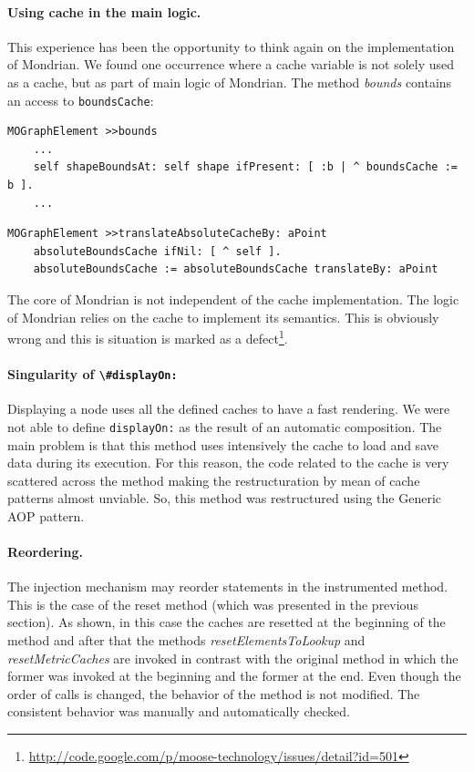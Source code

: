 \documentclass[preprint,10pt]{sigplanconf}
\newcommand{\ct}{\lstinline[backgroundcolor=\color{white},basicstyle=\footnotesize\ttfamily]}
\begin{document}
\paragraph{Using cache in the main logic.}
This experience has been the opportunity to think again on the implementation of Mondrian. We found one occurrence where a cache variable is not solely used as a cache, but as part of main logic of Mondrian. The method \emph{bounds} contains an access to \ct{boundsCache}: 

\begin{lstlisting} 
MOGraphElement >>bounds
	...
	self shapeBoundsAt: self shape ifPresent: [ :b | ^ boundsCache := b ].
	...
\end{lstlisting}

\begin{lstlisting} 
MOGraphElement >>translateAbsoluteCacheBy: aPoint
	absoluteBoundsCache ifNil: [ ^ self ].
	absoluteBoundsCache := absoluteBoundsCache translateBy: aPoint
\end{lstlisting}

The core of Mondrian is not independent of the cache implementation. The logic of Mondrian relies on the cache to implement its semantics. This is obviously wrong and this is situation is marked as a defect\footnote{\url{http://code.google.com/p/moose-technology/issues/detail?id=501}}.

\paragraph{Singularity of \ct{\#displayOn:}} Displaying a node uses all the defined caches to have a fast rendering. We were not able to define \ct{displayOn:} as the result of an automatic composition. The main problem is that this method uses intensively the cache to load and save data during its execution. For this reason, the code related to the cache is very scattered across the method making the restructuration by mean of cache patterns almost unviable. So, this method was restructured using the Generic AOP pattern. 


\paragraph{Reordering.} The injection mechanism may reorder statements in the instrumented method. This is the case of the reset method (which was presented in the previous section). As shown, in this case the caches are resetted at the beginning of the method and after that the methods \emph{resetElementsToLookup} and \emph{resetMetricCaches} are invoked in contrast with the original method in which the former was invoked at the beginning and the former at the end. Even though the order of calls is changed, the behavior of the method is not modified. The consistent behavior was manually and automatically checked.
\end{document}
